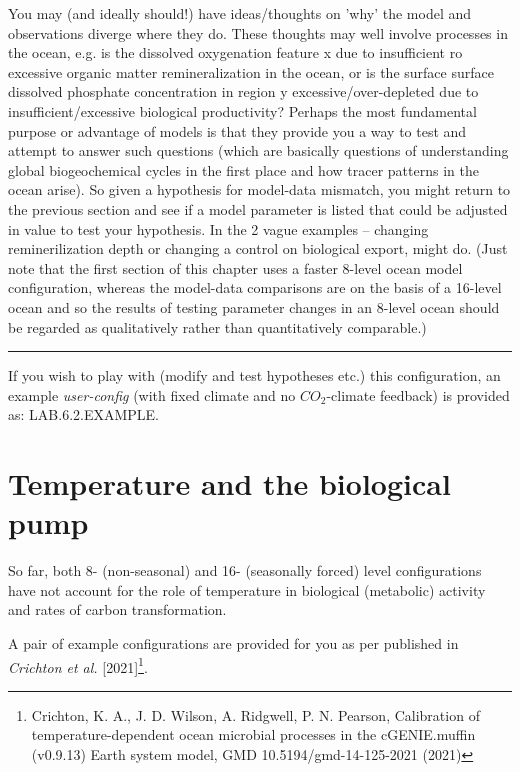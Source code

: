 You may (and ideally should!) have ideas/thoughts on 'why' the model and observations diverge where they do. These thoughts may well involve processes in the ocean, e.g. is the dissolved oxygenation feature x due to insufficient ro excessive organic matter remineralization in the ocean, or is the surface surface dissolved phosphate concentration in region y excessive/over-depleted due to insufficient/excessive biological productivity? Perhaps the most fundamental purpose or advantage of models is that they provide you a way to test and attempt to answer such questions (which are basically questions of understanding global biogeochemical cycles in the first place and how tracer patterns in the ocean arise). So given a hypothesis for model-data mismatch, you might return to the previous section and see if a model parameter is listed that could be adjusted in value to test your hypothesis. In the 2 vague examples -- changing reminerilization depth or changing a control on biological export, might do. (Just note that the first section of this chapter uses a faster 8-level ocean model configuration, whereas the model-data comparisons are on the basis of a 16-level ocean and so the results of testing parameter changes in an 8-level ocean should be regarded as qualitatively rather than quantitatively comparable.)

\vspace{1mm} \noindent\rule{4cm}{0.1mm} \vspace{2mm}

\noindent If you wish to play with (modify and test hypotheses etc.) this configuration, an example \textit{user-config} (with fixed climate and no $CO_{2}$-climate feedback) is provided as: \textsf{\footnotesize LAB.6.2.EXAMPLE}.

\newpage

\section{Temperature and the biological pump}

So far, both 8- (non-seasonal) and 16- (seasonally forced) level configurations have not account for the role of temperature in biological (metabolic) activity and rates of carbon transformation.

\vspace{1mm}
A pair of example configurations are provided for you as per published in \textit{Crichton et al.} [2021]\footnote{Crichton, K. A., J. D. Wilson, A. Ridgwell, P. N. Pearson, Calibration of temperature-dependent ocean microbial processes in the cGENIE.muffin (v0.9.13) Earth system model, GMD 10.5194/gmd-14-125-2021 (2021)}. 

